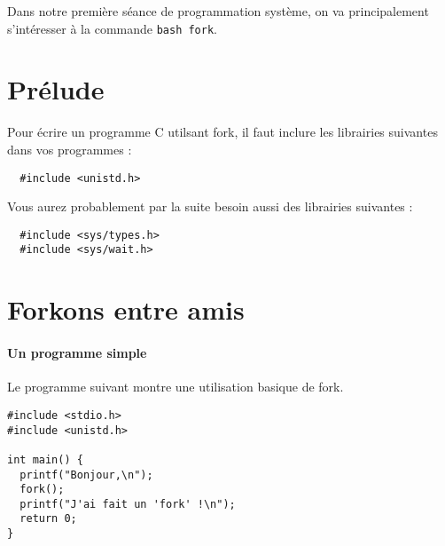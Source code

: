 \documentclass[11pt]{article}
\newcommand{\numtd}{08}
\newcommand{\titretd}{Fork \& co}
\begin{document}
\entete{\numtd}{\titretd}

\begin{introduction}
Dans notre première séance de programmation système, on va principalement s'intéresser à la commande \verb|bash fork|.
\end{introduction}

\section{Prélude}

Pour écrire un programme C utilsant fork, il faut inclure les librairies suivantes dans vos programmes :

\begin{verbatim}
  #include <unistd.h>
\end{verbatim}

Vous aurez probablement par la suite besoin aussi des librairies suivantes :

\begin{verbatim}
  #include <sys/types.h>
  #include <sys/wait.h>
\end{verbatim}

\section{Forkons entre amis}

\paragraph{Un programme simple}

Le programme suivant montre une utilisation basique de fork{}.
\begin{verbatim}
#include <stdio.h>
#include <unistd.h>

int main() {
  printf("Bonjour,\n");
  fork();
  printf("J'ai fait un 'fork' !\n");
  return 0;
}
\end{verbatim}
\end{document}
